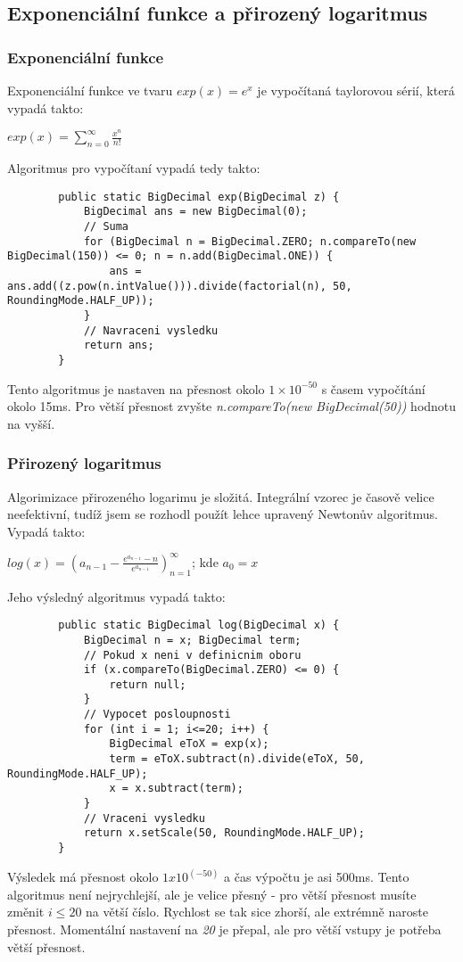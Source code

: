 \documentclass{article}
\begin{document}
    \subsection{Exponenciální funkce a přirozený logaritmus}
    \subsubsection{Exponenciální funkce}
    Exponenciální funkce ve tvaru $exp(x) = e^x$ je vypočítaná taylorovou sérií, která vypadá takto:
    \begin{center}
        $exp(x)=\displaystyle\sum_{n=0}^{\infty}\frac{x^n}{n!}$
    \end{center}
    Algoritmus pro vypočítaní vypadá tedy takto:
    \begin{lstlisting}
        public static BigDecimal exp(BigDecimal z) {
            BigDecimal ans = new BigDecimal(0);
            // Suma
            for (BigDecimal n = BigDecimal.ZERO; n.compareTo(new BigDecimal(150)) <= 0; n = n.add(BigDecimal.ONE)) {
                ans = ans.add((z.pow(n.intValue())).divide(factorial(n), 50, RoundingMode.HALF_UP));
            }
            // Navraceni vysledku
            return ans;
        }
    \end{lstlisting}
    Tento algoritmus je nastaven na přesnost okolo $1\times{10^{-50}}$ s časem vypočítání okolo 15ms. Pro
    větší přesnost zvyšte \textit{n.compareTo(new BigDecimal(50))} hodnotu na vyšší.
    \subsubsection{Přirozený logaritmus}
    Algorimizace přirozeného logarimu je složitá. Integrální vzorec je časově velice neefektivní, tudíž jsem
    se rozhodl použít lehce upravený Newtonův algoritmus. Vypadá takto:
    \begin{center}
        $log(x)=(a_{n-1}-\frac{e^{a_{n-1}}-n}{e^{a_{n-1}}})_{n=1}^{\infty}$; kde $a_0 = x$
    \end{center}
    Jeho výsledný algoritmus vypadá takto:
    \newline\newline
    \begin{lstlisting}
        public static BigDecimal log(BigDecimal x) {
            BigDecimal n = x; BigDecimal term;
            // Pokud x neni v definicnim oboru
            if (x.compareTo(BigDecimal.ZERO) <= 0) {
                return null;
            }
            // Vypocet posloupnosti
            for (int i = 1; i<=20; i++) {
                BigDecimal eToX = exp(x);
                term = eToX.subtract(n).divide(eToX, 50, RoundingMode.HALF_UP);
                x = x.subtract(term);
            }
            // Vraceni vysledku
            return x.setScale(50, RoundingMode.HALF_UP);
        }
    \end{lstlisting}
    Výsledek má přesnost okolo $1x10^(-50)$ a čas výpočtu je asi 500ms. Tento algoritmus není nejrychlejší,
    ale je velice přesný - pro větší přesnost musíte změnit \textit{$i \leq 20$} na větší číslo. Rychlost se
    tak sice zhorší, ale extrémně naroste přesnost. Momentální nastavení na \textit{20} je přepal, ale pro větší
    vstupy je potřeba větší přesnost.
\end{document}
